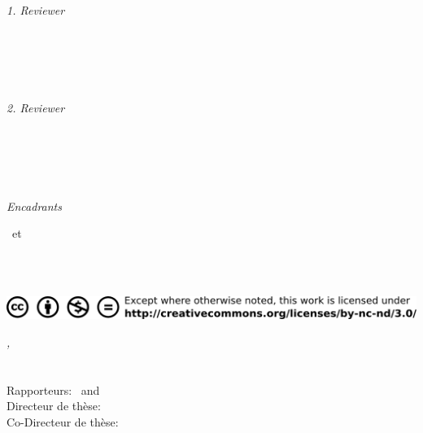 \begin{titlepage}
	\vfill
	\begin{minipage}[t]{.27\textwidth}
		\raggedleft
		\textit{1. Reviewer}
	\end{minipage}
	\hspace*{15pt}
	\begin{minipage}[t]{.65\textwidth}
		{\Large \thesisFirstReviewer} \\
	  	{\small \thesisFirstReviewerDepartment} \\[-1mm]
		{\small \thesisFirstReviewerUniversity}
	\end{minipage} \\[5mm]
	\begin{minipage}[t]{.27\textwidth}
		\raggedleft
		\textit{2. Reviewer}
	\end{minipage}
	\hspace*{15pt}
	\begin{minipage}[t]{.65\textwidth}
		{\Large \thesisSecondReviewer} \\
	  	{\small \thesisSecondReviewerDepartment} \\[-1mm]
		{\small \thesisSecondReviewerUniversity}
	\end{minipage} \\[10mm]
	\begin{minipage}[t]{.27\textwidth}
		\raggedleft
		\textit{Encadrants}
	\end{minipage}
	\hspace*{15pt}
	\begin{minipage}[t]{.65\textwidth}
		\thesisFirstSupervisor\ et \thesisSecondSupervisor
	\end{minipage} \\[10mm]

	\thesisDate \\
    \vfill
    
    \includegraphics[width=\textwidth]{gfx/cc_nc_nd.png}

\end{titlepage}


\hfill
\vfill
{
	\small
	\textit{\thesisTitle,} \thesisName \\
    \textcopyright\ \thesisDate \\
	\thesisSubject\\
	Rapporteurs: \thesisFirstReviewer\ and \thesisSecondReviewer \\
	Directeur de th\`ese: \thesisFirstSupervisor\\
    Co-Directeur de th\`ese: \thesisSecondSupervisor \\[1.5em]
	\textbf{\thesisUniversity} \\
	\thesisUniversityDepartment \\
    \textit{\thesisUniversityGroup} \\
	\thesisUniversityInstitute \\
	\thesisUniversityStreetAddress \\
	\thesisUniversityPostalCode\ \thesisUniversityCity
}
